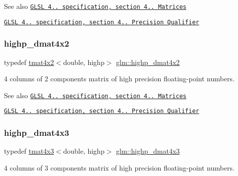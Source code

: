 \begin{DoxySeeAlso}{See also}
\href{http://www.opengl.org/registry/doc/GLSLangSpec.4.20.8.pdf}{\tt G\+L\+SL 4.. specification, section 4.. Matrices} 

\href{http://www.opengl.org/registry/doc/GLSLangSpec.4.20.8.pdf}{\tt G\+L\+SL 4.. specification, section 4.. Precision Qualifier} 
\end{DoxySeeAlso}
\mbox{\label{group__core__precision_gaa0a2369be2e3d5a4db98cae345413dc1}} 
\subsubsection{\texorpdfstring{highp\+\_\+dmat4x2}{highp\_dmat4x2}}
{\footnotesize\ttfamily typedef \hyperlink{structglm_1_1tmat4x2}{tmat4x2}$<$double, highp$>$ \hyperlink{group__core__precision_gaa0a2369be2e3d5a4db98cae345413dc1}{glm\+::highp\+\_\+dmat4x2}}

4 columns of 2 components matrix of high precision floating-\/point numbers.

\begin{DoxySeeAlso}{See also}
\href{http://www.opengl.org/registry/doc/GLSLangSpec.4.20.8.pdf}{\tt G\+L\+SL 4.. specification, section 4.. Matrices} 

\href{http://www.opengl.org/registry/doc/GLSLangSpec.4.20.8.pdf}{\tt G\+L\+SL 4.. specification, section 4.. Precision Qualifier} 
\end{DoxySeeAlso}
\mbox{\label{group__core__precision_gaec00d802f271a807485a0069cdb5ea05}} 
\subsubsection{\texorpdfstring{highp\+\_\+dmat4x3}{highp\_dmat4x3}}
{\footnotesize\ttfamily typedef \hyperlink{structglm_1_1tmat4x3}{tmat4x3}$<$double, highp$>$ \hyperlink{group__core__precision_gaec00d802f271a807485a0069cdb5ea05}{glm\+::highp\+\_\+dmat4x3}}

4 columns of 3 components matrix of high precision floating-\/point numbers.

